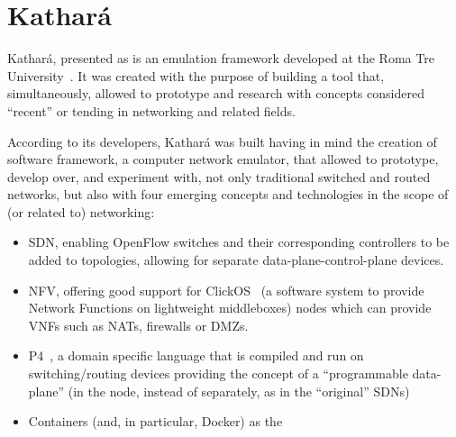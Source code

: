 \section{Kathará}
\label{sec:exemulkathara}

Kathará, presented as  is an emulation framework developed at the Roma Tre University~\cite{kathara}.
It was created with the purpose of building a tool that, simultaneously, allowed to prototype and research with concepts considered ``recent'' or tending in networking and related fields.

According to its developers, Kathará was built having in mind the creation of software framework, a computer network emulator, that allowed to prototype, develop over, and experiment with, not only traditional switched and routed networks, but also with four emerging concepts and technologies in the scope of (or related to) networking:
\begin{itemize}
	\item SDN, enabling OpenFlow switches and their corresponding controllers to be added to topologies, allowing for separate data-plane-control-plane devices.
	\item NFV, offering good support for ClickOS~\cite{clickos} (a software system to provide Network Functions on lightweight middleboxes) nodes which can provide VNFs such as NATs, firewalls or DMZs.
	\item P4~\cite{p4programming}, a domain specific language that is compiled and run on switching/routing devices providing the concept of a ``programmable data-plane'' (in the node, instead of separately, as in the ``original'' SDNs)
	\item Containers (and, in particular, Docker) as the 
\end{itemize}

